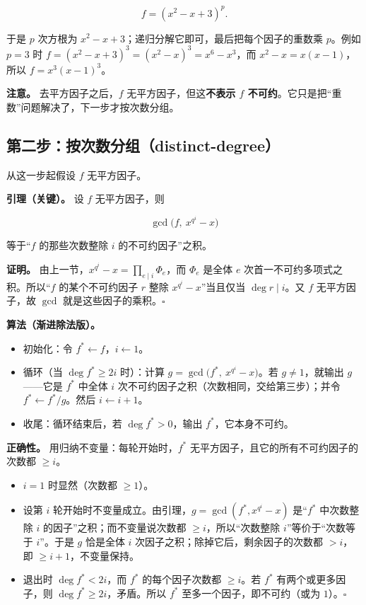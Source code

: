 \[
f=(x^2-x+3)^p .
\]

于是 $p$ 次方根为 $x^2-x+3$；递归分解它即可，最后把每个因子的重数乘 $p$。例如 $p=3$ 时 $f=(x^2-x+3)^3=(x^2-x)^3=x^6-x^3$，而 $x^2-x=x(x-1)$，所以 $f=x^3(x-1)^3$。

\textbf{注意。} 去平方因子之后，$f$ 无平方因子，但这\textbf{不表示 $f$ 不可约}。它只是把“重数”问题解决了，下一步才按次数分组。

\subsection{第二步：按次数分组（distinct-degree）}


从这一步起假设 $f$ 无平方因子。

\textbf{引理（关键）。} 设 $f$ 无平方因子，则

\[
\gcd\bigl(f,\ x^{q^i}-x\bigr)
\]

等于“$f$ 的那些次数整除 $i$ 的不可约因子”之积。

\textbf{证明。} 由上一节，$x^{q^i}-x=\prod_{e\mid i}\Phi_e$，而 $\Phi_e$ 是全体 $e$ 次首一不可约多项式之积。所以“$f$ 的某个不可约因子 $r$ 整除 $x^{q^i}-x$”当且仅当 $\deg r\mid i$。又 $f$ 无平方因子，故 $\gcd$ 就是这些因子的乘积。$\square$

\textbf{算法（渐进除法版）。}

\begin{itemize}
\item 初始化：令 $f^\ast\leftarrow f$，$i\leftarrow1$。
\item 循环（当 $\deg f^\ast\ge 2i$ 时）：计算 $g=\gcd\bigl(f^\ast,\ x^{q^i}-x\bigr)$。若 $g\ne1$，就输出 $g$——它是 $f^\ast$ 中全体 $i$ 次不可约因子之积（次数相同，交给第三步）；并令 $f^\ast\leftarrow f^\ast/g$。然后 $i\leftarrow i+1$。
\item 收尾：循环结束后，若 $\deg f^\ast>0$，输出 $f^\ast$，它本身不可约。
\end{itemize}


\textbf{正确性。} 用归纳不变量：每轮开始时，$f^\ast$ 无平方因子，且它的所有不可约因子的次数都 $\ge i$。

\begin{itemize}
\item $i=1$ 时显然（次数都 $\ge1$）。
\item 设第 $i$ 轮开始时不变量成立。由引理，$g=\gcd(f^\ast,x^{q^i}-x)$ 是“$f^\ast$ 中次数整除 $i$ 的因子”之积；而不变量说次数都 $\ge i$，所以“次数整除 $i$”等价于“次数等于 $i$”。于是 $g$ 恰是全体 $i$ 次因子之积；除掉它后，剩余因子的次数都 $>i$，即 $\ge i+1$，不变量保持。
\item 退出时 $\deg f^\ast<2i$，而 $f^\ast$ 的每个因子次数都 $\ge i$。若 $f^\ast$ 有两个或更多因子，则 $\deg f^\ast\ge2i$，矛盾。所以 $f^\ast$ 至多一个因子，即不可约（或为 $1$）。$\square$
\end{itemize}


